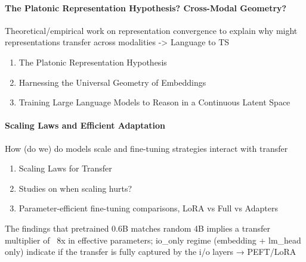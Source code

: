 \paragraph{The Platonic Representation Hypothesis? Cross-Modal Geometry?}
Theoretical/empirical work on representation convergence to explain why might representations transfer across modalities -> Language to TS
\begin{enumerate}
    \item The Platonic Representation Hypothesis \citep{huh2024platonicrepresentationhypothesis}
    \item Harnessing the Universal Geometry of Embeddings \citep{jha2025harnessinguniversalgeometryembeddings}
    \item Training Large Language Models to Reason in a Continuous Latent Space \citep{hao2024traininglargelanguagemodels}
\end{enumerate}

\paragraph{Scaling Laws and Efficient Adaptation}
How (do we) do models scale and fine-tuning strategies interact with transfer
\begin{enumerate}
    \item Scaling Laws for Transfer \citep{hernandez2021scalinglawstransfer}
    \item Studies on when scaling hurts? \citep{}
    \item Parameter-efficient fine-tuning comparisons, LoRA vs Full vs Adapters \citep{}
\end{enumerate}
The findings that pretrained 0.6B matches random 4B implies a transfer multiplier of ~8x in effective parameters; io\_only regime (embedding + lm\_head only) indicate if the transfer is fully captured by the i/o layers → PEFT/LoRA